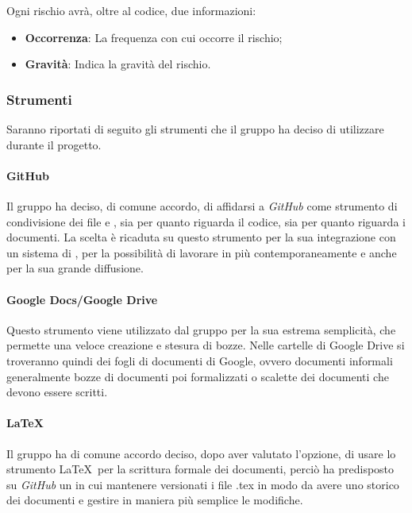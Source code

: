 Ogni rischio avrà, oltre al codice, due informazioni: 
\begin{itemize}
	\item \textbf{Occorrenza}: La frequenza con cui occorre il rischio;
	\item \textbf{Gravità}: Indica la gravità del rischio.
\end{itemize}

\subsubsection{Strumenti}

Saranno riportati di seguito gli strumenti che il gruppo ha deciso di utilizzare durante il progetto.

\paragraph{GitHub}

Il gruppo ha deciso, di comune accordo, di affidarsi a \emph{GitHub} come strumento di condivisione dei file e 
, sia per quanto riguarda il codice, sia per quanto riguarda i documenti. La scelta è 
ricaduta su questo strumento per la sua integrazione con un sistema di , per la possibilità 
di lavorare in più  contemporaneamente e anche per la sua grande diffusione.

\paragraph{Google Docs/Google Drive}

Questo strumento viene utilizzato dal gruppo per la sua estrema semplicità, che permette una veloce creazione e stesura 
di bozze. Nelle cartelle di Google Drive si troveranno quindi dei fogli di documenti di Google, ovvero documenti 
informali generalmente bozze di documenti poi formalizzati o scalette dei documenti che devono essere scritti.

\paragraph{\LaTeX}

Il gruppo ha di comune accordo deciso, dopo aver valutato l'opzione, di usare lo strumento \LaTeX\ per la scrittura 
formale dei documenti, perciò ha predisposto su \emph{GitHub} un  in cui mantenere versionati i 
file .tex in modo da avere uno storico dei documenti e gestire in maniera più semplice le modifiche.

